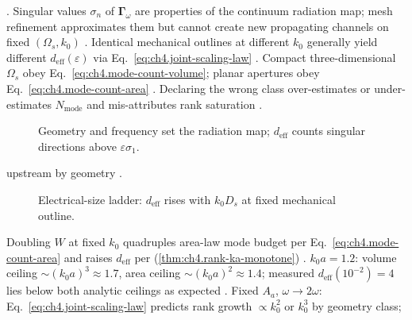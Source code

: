 \cite{harrington2001}. Singular values \(\sigma_{n}\) of \(\boldsymbol{\Gamma}_\omega\) are properties of the continuum radiation map;
mesh refinement approximates them but cannot create new propagating channels on fixed \((\Omega_{s},k_{0})\) \cite{devaney2004}.
\label{cor:ch4.cad-rank-decouple}
Identical mechanical outlines at different \(k_{0}\) generally yield different \(d_{\mathrm{eff}}(\varepsilon)\) via Eq.~\eqref{eq:ch4.joint-scaling-law}
\cite{stratton1941}.
Compact three-dimensional \(\Omega_{s}\) obey Eq.~\eqref{eq:ch4.mode-count-volume}; planar apertures obey Eq.~\eqref{eq:ch4.mode-count-area}
\cite{collin2001}. Declaring the wrong class over-estimates or under-estimates \(N_{\mathrm{mode}}\) and mis-attributes rank
saturation \cite{stratton1941}.
\begin{figure}[t]
\centering
{}
\caption{Geometry and frequency set the radiation map; \(d_{\mathrm{eff}}\) counts singular directions above \(\varepsilon\sigma_{1}\).}
\label{fig:ch4.geometry-rank-map}
\end{figure}
upstream by geometry \cite{stratton1941}.
\begin{figure}[t]
\centering
{}
\caption{Electrical-size ladder: \(d_{\mathrm{eff}}\) rises with \(k_{0}D_{s}\) at fixed mechanical outline.}
\label{fig:ch4.electrical-size-ladder}
\end{figure}
Doubling \(W\) at fixed \(k_{0}\) quadruples area-law mode budget per Eq.~\eqref{eq:ch4.mode-count-area} and raises \(d_{\mathrm{eff}}\) per
(\ref{thm:ch4.rank-ka-monotone}) \cite{collin2001}.
\(k_{0}a=1.2\): volume ceiling \(\sim(k_{0}a)^{3}\approx1.7\), area ceiling \(\sim(k_{0}a)^{2}\approx1.4\); measured \(d_{\mathrm{eff}}(10^{-2})=4\) lies
below both analytic ceilings as expected \cite{hansen1988}.
Fixed \(A_{a}\), \(\omega\to2\omega\): Eq.~\eqref{eq:ch4.joint-scaling-law} predicts rank growth \(\propto k_{0}^{2}\) or \(k_{0}^{3}\) by geometry class;
